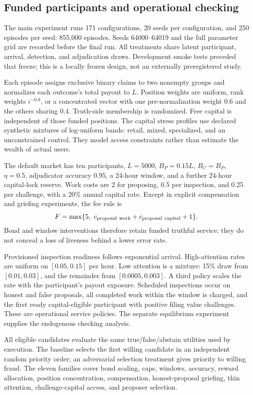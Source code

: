 \documentclass[10pt]{article}
\begin{document}
\subsection{Funded participants and operational checking}

The main experiment runs 171 configurations, 20 seeds per configuration, and 250 episodes per seed: 855{,}000 episodes. Seeds 64000--64019 and the full parameter grid are recorded before the final run. All treatments share latent participant, arrival, detection, and adjudication draws. Development smoke tests preceded that freeze; this is a locally frozen design, not an externally preregistered study.

Each episode assigns exclusive binary claims to two nonempty groups and normalizes each outcome's total payout to $L$. Position weights are uniform, rank weights $i^{-0.8}$, or a concentrated vector with one pre-normalization weight $0.6$ and the others sharing $0.4$. Truth-side membership is randomized. Free capital is independent of those funded positions. The capital stress profiles use declared synthetic mixtures of log-uniform bands: retail, mixed, specialized, and an unconstrained control. They model access constraints rather than estimate the wealth of actual users.

The default market has ten participants, $L=5000$, $B_P=0.15L$, $B_C=B_P$, $\eta=0.5$, adjudicator accuracy $0.95$, a 24-hour window, and a further 24-hour capital-lock reserve. Work costs are 2 for proposing, 0.5 per inspection, and 0.25 per challenge, with a 20\% annual capital rate. Except in explicit compensation and griefing experiments, the fee rule is
\[
F=\max\{5,\ c_{\rm proposal\ work}+c_{\rm proposal\ capital}+1\}.
\]
Bond and window interventions therefore retain funded truthful service; they do not conceal a loss of liveness behind a lower error rate.

Provisioned inspection readiness follows exponential arrival. High-attention rates are uniform on $[0.05,0.15]$ per hour. Low attention is a mixture: 15\% draw from $[0.01,0.03]$, and the remainder from $[0.0005,0.003]$. A third policy scales the rate with the participant's payout exposure. Scheduled inspections occur on honest and false proposals, all completed work within the window is charged, and the first ready capital-eligible participant with positive filing value challenges. These are operational service policies. The separate equilibrium experiment supplies the endogenous checking analysis.

All eligible candidates evaluate the same true/false/abstain utilities used by execution. The baseline selects the first willing candidate in an independent random priority order; an adversarial selection treatment gives priority to willing fraud. The eleven families cover bond scaling, caps, windows, accuracy, reward allocation, position concentration, compensation, honest-proposal griefing, thin attention, challenge-capital access, and proposer selection.
\end{document}
